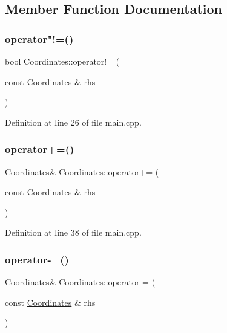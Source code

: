 \subsection{Member Function Documentation}
\mbox{\label{class_coordinates_a9dfe3f27ff9eb21ddfafdae7b6713071}} 
\subsubsection{\texorpdfstring{operator"!=()}{operator!=()}}
{\footnotesize\ttfamily bool Coordinates\+::operator!= (\begin{DoxyParamCaption}\item[{const \mbox{\hyperlink{class_coordinates}{Coordinates}} \&}]{rhs }\end{DoxyParamCaption})\hspace{0.3cm}{\ttfamily [inline]}}



Definition at line 26 of file main.\+cpp.

\mbox{\label{class_coordinates_a1cb590ea0170e486005033d0ed2db558}} 
\subsubsection{\texorpdfstring{operator+=()}{operator+=()}}
{\footnotesize\ttfamily \mbox{\hyperlink{class_coordinates}{Coordinates}}\& Coordinates\+::operator+= (\begin{DoxyParamCaption}\item[{const \mbox{\hyperlink{class_coordinates}{Coordinates}} \&}]{rhs }\end{DoxyParamCaption})\hspace{0.3cm}{\ttfamily [inline]}}



Definition at line 38 of file main.\+cpp.

\mbox{\label{class_coordinates_adbe709d2ce6d40b82de97a7dfebdd025}} 
\subsubsection{\texorpdfstring{operator-\/=()}{operator-=()}}
{\footnotesize\ttfamily \mbox{\hyperlink{class_coordinates}{Coordinates}}\& Coordinates\+::operator-\/= (\begin{DoxyParamCaption}\item[{const \mbox{\hyperlink{class_coordinates}{Coordinates}} \&}]{rhs }\end{DoxyParamCaption})\hspace{0.3cm}{\ttfamily [inline]}}



